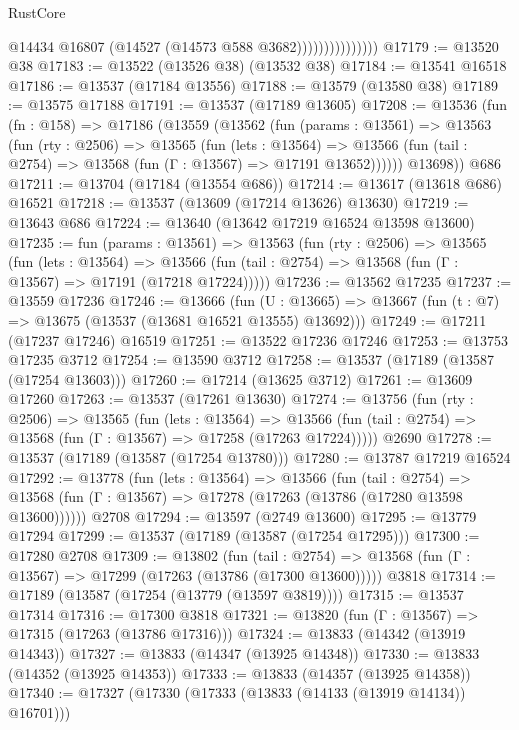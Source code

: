\begin{lexlean}{RustCore}
\begin{coremodule}
                              @14434
                              @16807
                              (@14527 (@14573 @588 @3682)))))))))))))))
@17179 := @13520 @38
@17183 := @13522 (@13526 @38) (@13532 @38)
@17184 := @13541 @16518
@17186 := @13537 (@17184 @13556)
@17188 := @13579 (@13580 @38)
@17189 := @13575 @17188
@17191 := @13537 (@17189 @13605)
@17208 := @13536
    (fun (fn : @158) =>
    @17186
      (@13559
        (@13562
          (fun (params : @13561) =>
          @13563
            (fun (rty : @2506) =>
            @13565
              (fun (lets : @13564) =>
              @13566 (fun (tail : @2754) => @13568 (fun (Γ : @13567) => @17191 @13652))))))
        @13698))
    @686
@17211 := @13704 (@17184 (@13554 @686))
@17214 := @13617 (@13618 @686) @16521
@17218 := @13537 (@13609 (@17214 @13626) @13630)
@17219 := @13643 @686
@17224 := @13640 (@13642 @17219 @16524 @13598 @13600)
@17235 := fun (params : @13561) =>
  @13563
    (fun (rty : @2506) =>
    @13565
      (fun (lets : @13564) =>
      @13566 (fun (tail : @2754) => @13568 (fun (Γ : @13567) => @17191 (@17218 @17224)))))
@17236 := @13562 @17235
@17237 := @13559 @17236
@17246 := @13666
    (fun (U : @13665) => @13667 (fun (t : @7) => @13675 (@13537 (@13681 @16521 @13555) @13692)))
@17249 := @17211 (@17237 @17246) @16519
@17251 := @13522 @17236 @17246
@17253 := @13753 @17235 @3712
@17254 := @13590 @3712
@17258 := @13537 (@17189 (@13587 (@17254 @13603)))
@17260 := @17214 (@13625 @3712)
@17261 := @13609 @17260
@17263 := @13537 (@17261 @13630)
@17274 := @13756
    (fun (rty : @2506) =>
    @13565
      (fun (lets : @13564) =>
      @13566 (fun (tail : @2754) => @13568 (fun (Γ : @13567) => @17258 (@17263 @17224)))))
    @2690
@17278 := @13537 (@17189 (@13587 (@17254 @13780)))
@17280 := @13787 @17219 @16524
@17292 := @13778
    (fun (lets : @13564) =>
    @13566
      (fun (tail : @2754) =>
      @13568 (fun (Γ : @13567) => @17278 (@17263 (@13786 (@17280 @13598 @13600))))))
    @2708
@17294 := @13597 (@2749 @13600)
@17295 := @13779 @17294
@17299 := @13537 (@17189 (@13587 (@17254 @17295)))
@17300 := @17280 @2708
@17309 := @13802
    (fun (tail : @2754) => @13568 (fun (Γ : @13567) => @17299 (@17263 (@13786 (@17300 @13600)))))
    @3818
@17314 := @17189 (@13587 (@17254 (@13779 (@13597 @3819))))
@17315 := @13537 @17314
@17316 := @17300 @3818
@17321 := @13820 (fun (Γ : @13567) => @17315 (@17263 (@13786 @17316)))
@17324 := @13833 (@14342 (@13919 @14343))
@17327 := @13833 (@14347 (@13925 @14348))
@17330 := @13833 (@14352 (@13925 @14353))
@17333 := @13833 (@14357 (@13925 @14358))
@17340 := @17327 (@17330 (@17333 (@13833 (@14133 (@13919 @14134)) @16701)))

\end{coremodule}
\end{lexlean}
